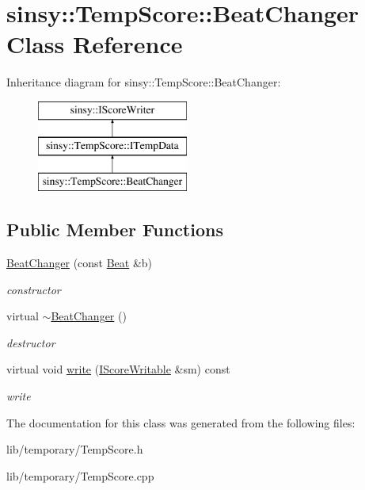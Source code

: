 \hypertarget{classsinsy_1_1TempScore_1_1BeatChanger}{\section{sinsy\-:\-:\-Temp\-Score\-:\-:\-Beat\-Changer \-Class \-Reference}
\label{classsinsy_1_1TempScore_1_1BeatChanger}
}
\-Inheritance diagram for sinsy\-:\-:\-Temp\-Score\-:\-:\-Beat\-Changer\-:\begin{figure}[H]
\begin{center}
\leavevmode
\includegraphics[height=3.000000cm]{classsinsy_1_1TempScore_1_1BeatChanger}
\end{center}
\end{figure}
\subsection*{\-Public \-Member \-Functions}
\begin{DoxyCompactItemize}
\item 
\hypertarget{classsinsy_1_1TempScore_1_1BeatChanger_ae4aae6a92ea81bd6f7be69738be89840}{\hyperlink{classsinsy_1_1TempScore_1_1BeatChanger_ae4aae6a92ea81bd6f7be69738be89840}{\-Beat\-Changer} (const \hyperlink{classsinsy_1_1Beat}{\-Beat} \&b)}\label{classsinsy_1_1TempScore_1_1BeatChanger_ae4aae6a92ea81bd6f7be69738be89840}

\begin{DoxyCompactList}\small\item\em constructor \end{DoxyCompactList}\item 
\hypertarget{classsinsy_1_1TempScore_1_1BeatChanger_aeeb6579ea768dc78960b1161501f0078}{virtual \hyperlink{classsinsy_1_1TempScore_1_1BeatChanger_aeeb6579ea768dc78960b1161501f0078}{$\sim$\-Beat\-Changer} ()}\label{classsinsy_1_1TempScore_1_1BeatChanger_aeeb6579ea768dc78960b1161501f0078}

\begin{DoxyCompactList}\small\item\em destructor \end{DoxyCompactList}\item 
\hypertarget{classsinsy_1_1TempScore_1_1BeatChanger_ae524ed795674a223d5dad411a063331d}{virtual void \hyperlink{classsinsy_1_1TempScore_1_1BeatChanger_ae524ed795674a223d5dad411a063331d}{write} (\hyperlink{classsinsy_1_1IScoreWritable}{\-I\-Score\-Writable} \&sm) const }\label{classsinsy_1_1TempScore_1_1BeatChanger_ae524ed795674a223d5dad411a063331d}

\begin{DoxyCompactList}\small\item\em write \end{DoxyCompactList}\end{DoxyCompactItemize}


\-The documentation for this class was generated from the following files\-:\begin{DoxyCompactItemize}
\item 
lib/temporary/\-Temp\-Score.\-h\item 
lib/temporary/\-Temp\-Score.\-cpp\end{DoxyCompactItemize}
